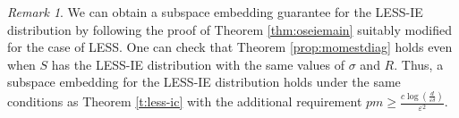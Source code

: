 \documentclass[11pt]{amsart}
\numberwithin{equation}{section}
\numberwithin{equation}{section}
\DeclareMathOperator{\Pb}{\mathbb{P}}
\DeclareMathOperator{\nnz}{nnz}
\DeclarePairedDelimiter{\paren}{(}{)}
\theoremstyle{remark}
\newtheorem{remark}[theorem]{Remark}
\theoremstyle{definition}
\begin{document}
\begin{remark}
    We can obtain a subspace embedding guarantee for the LESS-IE distribution by following the proof of Theorem \ref{thm:oseiemain} suitably modified for the case of LESS. One can check that Theorem \ref{prop:momestdiag} holds even when $S$ has the LESS-IE distribution with the same values of $\sigma$ and $R$. Thus, a subspace embedding for the LESS-IE distribution holds under the same conditions as Theorem \ref{t:less-ic} with the additional requirement $pm \ge \frac{c \log (\frac{d}{\varepsilon \delta})}{\varepsilon^2}$.  
\end{remark}


\begin{comment}
\begin{theorem}[High Probability Bounds for the Embedding Error of LESS-IC]\label{thm:lessdecoup}
Let $S$ be an $m \times n$ matrix distributed according to the $8 \lceil\log (\frac{d}{\varepsilon \delta})\rceil$-wise independent unscaled LESS-IC distribution with parameter $p$ for some fixed matrix $U$ satisfying $U^TU=I$ with given $(\beta_1, \beta_2)$-approximate leverage scores. Then, there exist constants $c_{\ref*{thm:lessdecoup}.1}$ and $c_{\ref*{thm:lessdecoup}.2}$ such that for any $0 < \varepsilon, \delta < 1$ and $d>10$, we have 
\begin{align*}
\Pb \left( 1 - \varepsilon  \leq s_{\min}((1/\sqrt{pm})SU)   \leq s_{\max}((1/\sqrt{pm})SU) \leq 1 + \varepsilon \right) \geq 1-\delta
\end{align*}
when $m \ge c_{\ref*{thm:lessdecoup}.1}  \max \left\{ \frac{d + \log(d/\delta)^2 + \log(1/\varepsilon)}{\varepsilon^2} , \frac{\log(d/\delta)^3}{\varepsilon} \right\}$ and \begin{align*} pm \ge  \min \left \{  c_{\ref*{thm:lessdecoup}.2}\paren*{\frac{(\log ({d/\delta\varepsilon}))^{2.5}}{\varepsilon} + (\log ({d/\delta\varepsilon}))^{3}  }, m  \right \} \end{align*} The matrix $S$ has $O(\beta pmd + n)$ many non zero entries and can be applied to an $n\times d$ matrix $A$ in $O(\nnz(A) + \beta pmd^2)$ time.
\end{theorem}
\end{comment}
\end{document}
